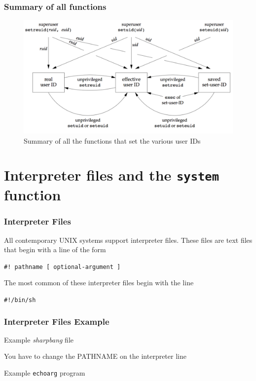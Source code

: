 \documentclass[newPxFont,sthlmFooter,nooffset]{beamer}
\begin{document}
\begin{frame}
  \frametitle{Summary of all functions}
  \begin{figure}[h]
    \centering
    \includegraphics[width=\linewidth]{figure/fig8-19_summary.png}
    \caption{Summary of all the functions that set the various user IDs}
    \label{fig:summary}
  \end{figure}
\end{frame}







\section{Interpreter files and the \texttt{system} function}
\begin{frame}[t]
  \frametitle{Interpreter Files}
All contemporary UNIX systems support interpreter files. These files are text files that begin with a line of the form

\texttt{\#! pathname [ optional-argument ]}

The most common of these interpreter files begin with the line

\texttt{\#!/bin/sh}

\end{frame}

\begin{frame}[containsverbatim,t]
  \frametitle{Interpreter Files Example}

Example \textit{sharpbang} file


You have to change the PATHNAME on the interpreter line

Example \texttt{echoarg} program

\end{frame}
\end{document}
